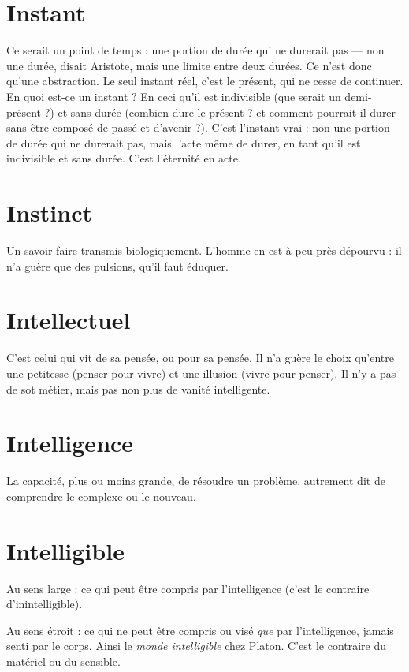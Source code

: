 \section{Instant}
Ce serait un point de temps : une portion de durée qui ne durerait
pas — non une durée, disait Aristote, mais une limite entre
deux durées. Ce n’est donc qu’une abstraction. Le seul instant réel, c’est le présent,
qui ne cesse de continuer. En quoi est-ce un instant ? En ceci qu'il est
indivisible (que serait un demi-présent ?) et sans durée (combien dure le
présent ? et comment pourrait-il durer sans être composé de passé et
d’avenir ?). C’est l'instant vrai : non une portion de durée qui ne durerait pas,
mais l'acte même de durer, en tant qu’il est indivisible et sans durée. C’est
l'éternité en acte.

\section{Instinct}
Un savoir-faire transmis biologiquement. L'homme en est à
peu près dépourvu : il n’a guère que des pulsions, qu’il faut
éduquer.

\section{Intellectuel}
C'est celui qui vit de sa pensée, ou pour sa pensée. Il n’a
guère le choix qu’entre une petitesse (penser pour vivre)
et une illusion (vivre pour penser). Il n’y a pas de sot métier, mais pas non plus
de vanité intelligente.

\section{Intelligence}
La capacité, plus ou moins grande, de résoudre un problème,
autrement dit de comprendre le complexe ou le
nouveau.

\section{Intelligible}
Au sens large : ce qui peut être compris par l'intelligence
(c’est le contraire d’inintelligible).

Au sens étroit : ce qui ne peut être compris ou visé {\it que} par l’intelligence,
jamais senti par le corps. Ainsi le {\it monde intelligible} chez Platon. C’est le
contraire du matériel ou du sensible.

